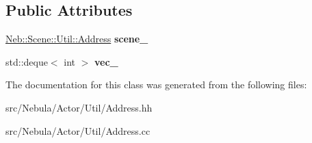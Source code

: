 \subsection*{Public Attributes}
\begin{DoxyCompactItemize}
\item 
\hypertarget{classNeb_1_1Actor_1_1Util_1_1Address_a4b757419781a7ed7804556d50beee5cf}{\hyperlink{classNeb_1_1Scene_1_1Util_1_1Address}{Neb\-::\-Scene\-::\-Util\-::\-Address} {\bfseries scene\-\_\-}}\label{classNeb_1_1Actor_1_1Util_1_1Address_a4b757419781a7ed7804556d50beee5cf}

\item 
\hypertarget{classNeb_1_1Actor_1_1Util_1_1Address_aa9d6e45cf09caf8475a2ee6b6c79892b}{std\-::deque$<$ int $>$ {\bfseries vec\-\_\-}}\label{classNeb_1_1Actor_1_1Util_1_1Address_aa9d6e45cf09caf8475a2ee6b6c79892b}

\end{DoxyCompactItemize}


The documentation for this class was generated from the following files\-:\begin{DoxyCompactItemize}
\item 
src/\-Nebula/\-Actor/\-Util/Address.\-hh\item 
src/\-Nebula/\-Actor/\-Util/Address.\-cc\end{DoxyCompactItemize}
